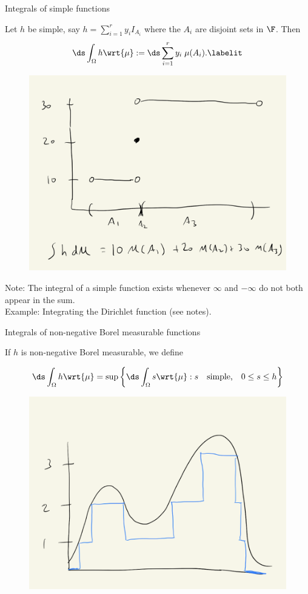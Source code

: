 \documentclass[10pt]{beamer}
\begin{document}
\begin{frame}{Integrals of simple functions}

\begin{definition}
Let $h$ be simple, say $h = \sum_{i=1}^r y_i I_{A_i}$ where the $A_i$ are disjoint sets in $\F$.  Then
\begin{align*}
\ds\int_{\Omega} h \wrt{\mu} := \ds\sum_{i=1}^r y_i \; \mu(A_i).
\labelit \label{eqn:integral_of_simple_function}	
\end{align*}
 \label{def:integral_of_simple_function}
\end{definition}

\begin{figure}[H]
\centering 
\includegraphics[width=.4\textwidth]{images/integral_of_simple_function}	
\end{figure}	

{\tiny Note: The integral of a simple function exists whenever $\infty$ and  $-\infty$ do not both appear in the sum. } \\
{\tiny Example: Integrating the Dirichlet function (see notes).} 
\end{frame}

\begin{frame}{Integrals of non-negative Borel measurable functions}
\begin{definition}

If $h$ is non-negative Borel measurable, we define 

\[  \ds\int_{\Omega} h \wrt{\mu} = \sup \bigg\{ \ds\int_{\Omega} s \wrt{\mu} : s \quad \text{simple,} \quad 0 \leq s \leq h  \bigg\} \]
\label{def:integral_of_non_negative_Borel_measurable_function}
\end{definition}


\begin{figure}[H]
\centering
\includegraphics[width=.4\textwidth]{images/simple_function_approximating_non_negative_function}	
\end{figure}

\end{frame}
\end{document}
